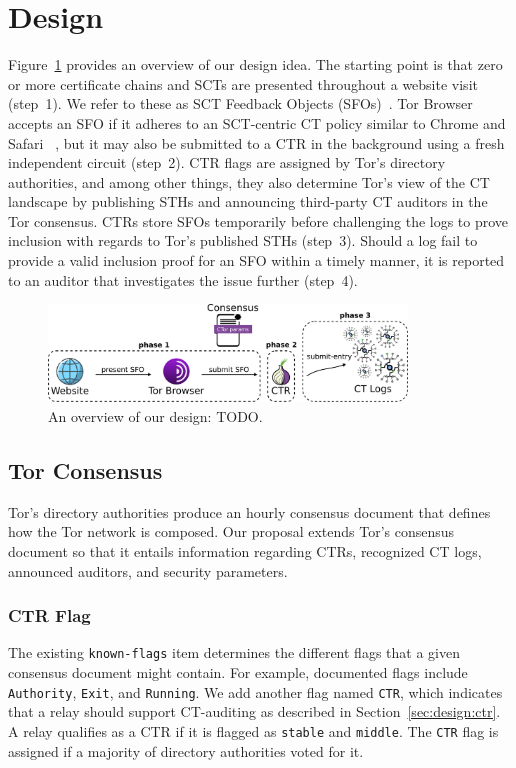 \section{Design} \label{sec:design}
Figure~\ref{fig:design-ca} provides an overview of our design idea.  The starting
point is that zero or more certificate chains and SCTs are presented
throughout a website visit (step~1).  We refer to these as SCT Feedback Objects
(SFOs)~\cite{nordberg}.  Tor Browser accepts an SFO if it adheres to an
SCT-centric CT policy similar to Chrome and Safari~%
\cite{chrome-policy,safari-policy}, but it may also be submitted to a CTR
in the background using a fresh independent circuit (step~2).  CTR flags are
assigned by Tor's directory authorities, and among other things, they also
determine Tor's view of the CT landscape by publishing STHs and announcing
third-party CT auditors in the Tor consensus.  CTRs store SFOs temporarily
before challenging the logs to prove inclusion with regards to Tor's published
STHs (step~3).  Should a log fail to provide a valid inclusion proof for an SFO
within a timely manner, it is reported to an auditor that investigates the issue
further (step~4).
\begin{figure}
	\centering
	\includegraphics[width=0.85\textwidth]{img/design-ca}
	\caption{An overview of our design: TODO. }
	\label{fig:design-ca}
\end{figure}

\subsection{Tor Consensus}
Tor's directory authorities produce an hourly consensus document that defines
how the Tor network is composed.  Our proposal extends Tor's consensus document
so that it entails information regarding
	CTRs,
	recognized CT logs,
	announced auditors, and
	security parameters.

\subsubsection{CTR Flag}
The existing \texttt{known-flags} item determines the different flags that a
given consensus document might contain.  For example, documented flags include
\texttt{Authority}, \texttt{Exit}, and \texttt{Running}.  We add another flag
named \texttt{CTR}, which indicates that a relay should support CT-auditing as
described in Section~\ref{sec:design:ctr}.  A relay qualifies as a CTR if it is
flagged as \texttt{stable} and \texttt{middle}.  The \texttt{CTR} flag is
assigned if a majority of directory authorities voted for it.

